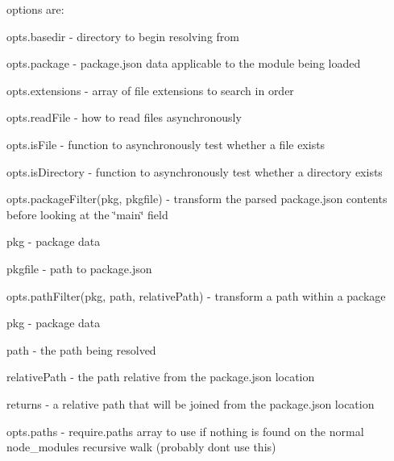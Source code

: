 options are\+:


\begin{DoxyItemize}
\item opts.\+basedir -\/ directory to begin resolving from
\item opts.\+package -\/ {\ttfamily package.\+json} data applicable to the module being loaded
\item opts.\+extensions -\/ array of file extensions to search in order
\item opts.\+read\+File -\/ how to read files asynchronously
\item opts.\+is\+File -\/ function to asynchronously test whether a file exists
\item opts.\+is\+Directory -\/ function to asynchronously test whether a directory exists
\item {\ttfamily opts.\+package\+Filter(pkg, pkgfile)} -\/ transform the parsed package.\+json contents before looking at the \char`\"{}main\char`\"{} field
\begin{DoxyItemize}
\item pkg -\/ package data
\item pkgfile -\/ path to package.\+json
\end{DoxyItemize}
\item {\ttfamily opts.\+path\+Filter(pkg, path, relative\+Path)} -\/ transform a path within a package
\begin{DoxyItemize}
\item pkg -\/ package data
\item path -\/ the path being resolved
\item relative\+Path -\/ the path relative from the package.\+json location
\item returns -\/ a relative path that will be joined from the package.\+json location
\end{DoxyItemize}
\item opts.\+paths -\/ require.\+paths array to use if nothing is found on the normal {\ttfamily node\+\_\+modules} recursive walk (probably don\textquotesingle{}t use this)


\end{DoxyItemize}
